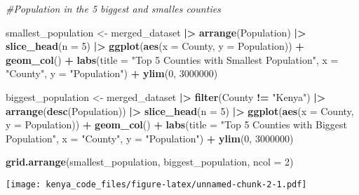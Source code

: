 \documentclass[
]{article}
\newenvironment{Shaded}{\begin{snugshade}}{\end{snugshade}}
\newcommand{\AttributeTok}[1]{\textcolor[rgb]{0.13,0.29,0.53}{#1}}
\newcommand{\CommentTok}[1]{\textcolor[rgb]{0.56,0.35,0.01}{\textit{#1}}}
\newcommand{\DecValTok}[1]{\textcolor[rgb]{0.00,0.00,0.81}{#1}}
\newcommand{\FunctionTok}[1]{\textcolor[rgb]{0.13,0.29,0.53}{\textbf{#1}}}
\newcommand{\NormalTok}[1]{#1}
\newcommand{\OtherTok}[1]{\textcolor[rgb]{0.56,0.35,0.01}{#1}}
\newcommand{\SpecialCharTok}[1]{\textcolor[rgb]{0.81,0.36,0.00}{\textbf{#1}}}
\newcommand{\StringTok}[1]{\textcolor[rgb]{0.31,0.60,0.02}{#1}}
\begin{document}
\begin{Shaded}
\begin{Highlighting}[]
\CommentTok{\#Population in the 5 biggest and smalles counties}

\NormalTok{smallest\_population }\OtherTok{\textless{}{-}}\NormalTok{ merged\_dataset }\SpecialCharTok{|\textgreater{}} 
  \FunctionTok{arrange}\NormalTok{(Population) }\SpecialCharTok{|\textgreater{}} 
  \FunctionTok{slice\_head}\NormalTok{(}\AttributeTok{n =} \DecValTok{5}\NormalTok{) }\SpecialCharTok{|\textgreater{}} 
  \FunctionTok{ggplot}\NormalTok{(}\FunctionTok{aes}\NormalTok{(}\AttributeTok{x =}\NormalTok{ County, }\AttributeTok{y =}\NormalTok{ Population)) }\SpecialCharTok{+}
  \FunctionTok{geom\_col}\NormalTok{() }\SpecialCharTok{+}
  \FunctionTok{labs}\NormalTok{(}\AttributeTok{title =} \StringTok{"Top 5 Counties with Smallest Population"}\NormalTok{,}
       \AttributeTok{x =} \StringTok{"County"}\NormalTok{,}
       \AttributeTok{y =} \StringTok{"Population"}\NormalTok{) }\SpecialCharTok{+} 
  \FunctionTok{ylim}\NormalTok{(}\DecValTok{0}\NormalTok{, }\DecValTok{3000000}\NormalTok{)}

\NormalTok{biggest\_population }\OtherTok{\textless{}{-}}\NormalTok{ merged\_dataset }\SpecialCharTok{|\textgreater{}}
  \FunctionTok{filter}\NormalTok{(County }\SpecialCharTok{!=} \StringTok{"Kenya"}\NormalTok{) }\SpecialCharTok{|\textgreater{}} 
  \FunctionTok{arrange}\NormalTok{(}\FunctionTok{desc}\NormalTok{(Population)) }\SpecialCharTok{|\textgreater{}} 
  \FunctionTok{slice\_head}\NormalTok{(}\AttributeTok{n =} \DecValTok{5}\NormalTok{) }\SpecialCharTok{|\textgreater{}} 
  \FunctionTok{ggplot}\NormalTok{(}\FunctionTok{aes}\NormalTok{(}\AttributeTok{x =}\NormalTok{ County, }\AttributeTok{y =}\NormalTok{ Population)) }\SpecialCharTok{+}
  \FunctionTok{geom\_col}\NormalTok{() }\SpecialCharTok{+}
  \FunctionTok{labs}\NormalTok{(}\AttributeTok{title =} \StringTok{"Top 5 Counties with Biggest Population"}\NormalTok{,}
       \AttributeTok{x =} \StringTok{"County"}\NormalTok{,}
       \AttributeTok{y =} \StringTok{"Population"}\NormalTok{) }\SpecialCharTok{+} 
  \FunctionTok{ylim}\NormalTok{(}\DecValTok{0}\NormalTok{, }\DecValTok{3000000}\NormalTok{)}

\FunctionTok{grid.arrange}\NormalTok{(smallest\_population, biggest\_population, }\AttributeTok{ncol =} \DecValTok{2}\NormalTok{)}
\end{Highlighting}
\end{Shaded}

\texttt{[image: kenya\_code\_files/figure-latex/unnamed-chunk-2-1.pdf]}
\end{document}
